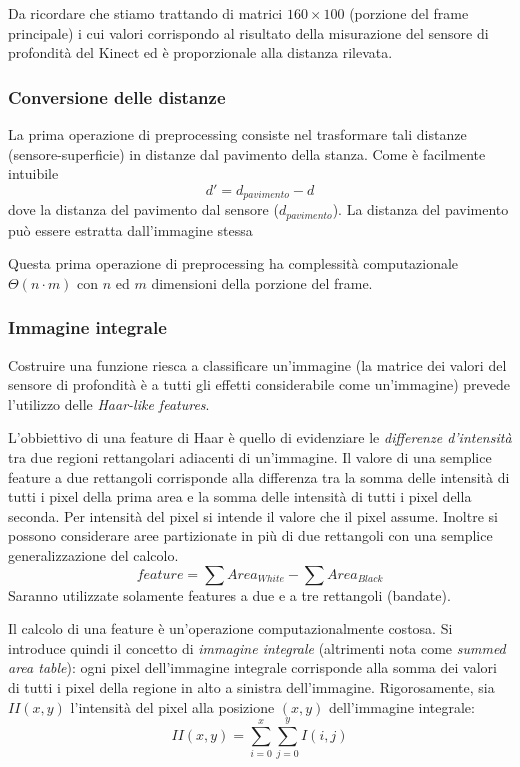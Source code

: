         Da ricordare che stiamo trattando di matrici $160 \times 100$ (porzione del frame principale) i cui valori corrispondo al risultato della misurazione del sensore di profondità del Kinect ed è proporzionale alla distanza rilevata.

        \subsubsection{Conversione delle distanze} %
        \label{ssub:conversione_delle_distanze}
            La prima operazione di preprocessing consiste nel trasformare tali distanze (sensore-superficie) in distanze dal pavimento della stanza. Come è facilmente intuibile
            $$ d' = d_{pavimento} - d $$
            dove la distanza del pavimento dal sensore ($d_{pavimento}$). La distanza del pavimento può essere estratta dall'immagine stessa

            Questa prima operazione di preprocessing ha complessità computazionale $\Theta(n \cdot m)$ con $n$ ed $m$ dimensioni della porzione del frame.

        \subsubsection{Immagine integrale} %
        \label{ssub:immagine_integrale}
            Costruire una funzione riesca a classificare un'immagine (la matrice dei valori del sensore di profondità è a tutti gli effetti considerabile come un'immagine) prevede l'utilizzo delle \emph{Haar-like features}.

            L'obbiettivo di una feature di Haar è quello di evidenziare le \emph{differenze d'intensità} tra due regioni rettangolari adiacenti di un'immagine. Il valore di una semplice feature a due rettangoli corrisponde alla differenza tra la somma delle intensità di tutti i pixel della prima area e la somma delle intensità di tutti i pixel della seconda. Per intensità del pixel si intende il valore che il pixel assume. Inoltre si possono considerare aree partizionate in più di due rettangoli con una semplice generalizzazione del calcolo.
            $$feature = \sum Area_{White} - \sum Area_{Black}$$
            Saranno utilizzate solamente features a due e a tre rettangoli (bandate).

            Il calcolo di una feature è un'operazione computazionalmente costosa. Si introduce quindi il concetto di \emph{immagine integrale} (altrimenti nota come \emph{summed area table}): ogni pixel dell'immagine integrale corrisponde alla somma dei valori di tutti i pixel della regione in alto a sinistra dell'immagine.
            Rigorosamente, sia $II(x,y)$ l'intensità del pixel alla posizione $(x,y)$ dell'immagine integrale: $$ II(x, y) = \sum_{i = 0}^{x} \sum_{j = 0}^{y} I(i, j) $$

